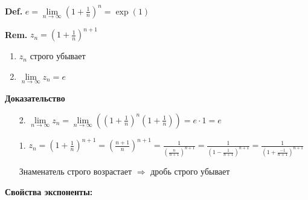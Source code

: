 \documentclass[14pt, letter paper]{article}
\begin{document}
\textbf{Def.} $e = \lim\limits_{n \rightarrow \infty}{(1 + \frac{1}{n})^n} = \exp(1)$

\textbf{Rem.} $z_n = (1 + \frac{1}{n})^{n+1}$

\begin{enumerate}
    \item $z_n$ строго убывает
    \item $\lim\limits_{n \rightarrow \infty}{z_n} = e$
\end{enumerate}

\begin{center}
    \textbf{Доказательство}
\end{center}

\begin{enumerate}
    \item[2.] $\lim\limits_{n \rightarrow \infty}{z_n} = \lim\limits_{n \rightarrow \infty}{((1 + \frac{1}{n})^n(1 + \frac{1}{n}))} = e \cdot 1 = e$ 
    \item[1.] $z_n = (1 + \frac{1}{n})^{n+1} = (\frac{n+1}{n})^{n+1} = \frac{1}{(\frac{n}{n+1})^{n+1}} = \frac{1}{(1 - \frac{1}{n+1})^{n+1}} = \frac{1}{(1 + \frac{-1}{n+1})^{n+1}}$

    Знаменатель строго возрастает $\Rightarrow$ дробь строго убывает
\end{enumerate}

\textbf{Свойства экспоненты:}
\end{document}

